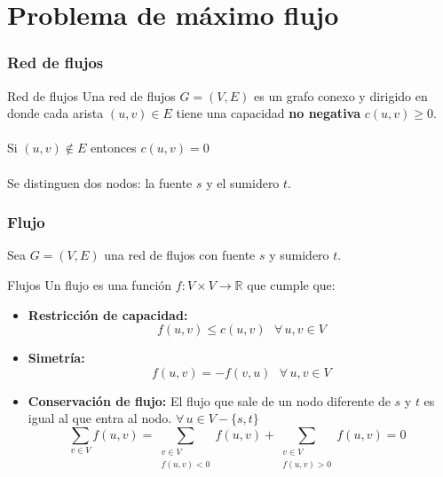 \documentclass{beamer}
\begin{document}
\section[Max-flow]{Problema de máximo flujo}
	
	\begin{frame}
		\frametitle{Red de flujos}
		\begin{block}{Red de flujos}
			Una red de flujos $G = (V, E)$ es un grafo conexo y dirigido en donde cada arista $(u, v) \in E$ tiene una capacidad \textbf{no negativa} $c(u,v) \geq 0$.\\ \quad \\
			Si $(u, v) \not\in E$ entonces $c(u, v) = 0$ \\ \quad \\
			Se distinguen dos nodos: la fuente $s$ y el sumidero $t$.
		\end{block}
	\end{frame}

	\begin{frame}
		\frametitle{Flujo}
		Sea $G = (V, E)$ una red de flujos con fuente $s$ y sumidero $t$.
		\begin{block}{Flujos}
			Un flujo es una función $f:V \times V \rightarrow \mathbb{R}$ que cumple que:
			\begin{itemize}
				\item \textbf{Restricción de capacidad:}
					$$f(u,v) \leq c(u,v) \,\,\,\, \forall\, u,v \in V$$
				\item \textbf{Simetría:} 
					$$f(u,v) = -f(v,u) \,\,\,\, \forall\, u,v \in V$$
				\item \textbf{Conservación de flujo:} El flujo que sale de un nodo diferente de $s$ y $t$ es igual al que entra al nodo. $\forall\, u \in V - \{s, t\}$ 
					$$\displaystyle\sum_{v \in V}{f(u,v)} = \displaystyle\sum_{\substack{v \in V\\f(u,v) < 0}}{f(u,v)} + \displaystyle\sum_{\substack{v \in V\\f(u,v) > 0}}{f(u,v)} = 0 \,\,\,\, $$
			\end{itemize}
		\end{block}
	\end{frame}
\end{document}
